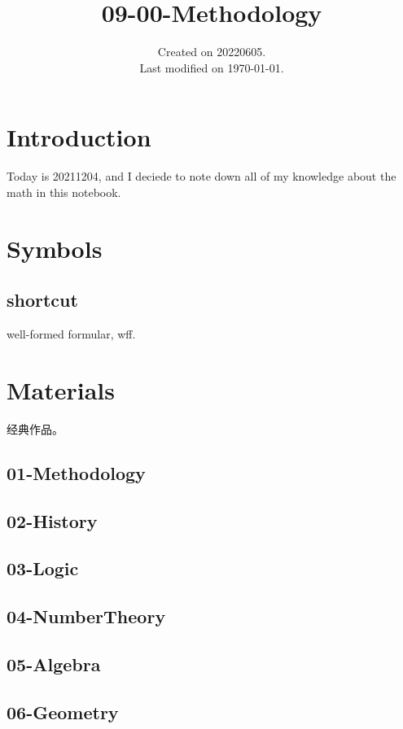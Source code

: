 \documentclass[UTF8]{../09-Mathematics}
\begin{document}
\title{09-00-Methodology}
\date{Created on 20220605.\\   Last modified on \today.}
\maketitle
\tableofcontents




\chapter{Introduction}
Today is 20211204, and I deciede to note down all of my knowledge about the math in this notebook.




\chapter{Symbols}


\section{shortcut}

well-formed formular, wff.





\chapter{Materials}
经典作品。
\section{01-Methodology}

\section{02-History}
\section{03-Logic}
\section{04-NumberTheory}
\section{05-Algebra}
\section{06-Geometry}
\end{document}
